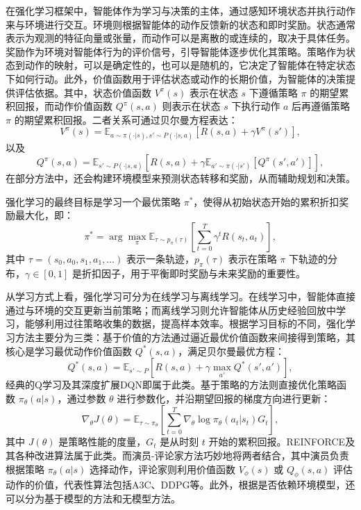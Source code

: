 在强化学习框架中，智能体作为学习与决策的主体，通过感知环境状态并执行动作来与环境进行交互。环境则根据智能体的动作反馈新的状态和即时奖励。状态通常表示为观测的特征向量或张量，而动作可以是离散的或连续的，取决于具体任务。奖励作为环境对智能体行为的评价信号，引导智能体逐步优化其策略。策略作为状态到动作的映射，可以是确定性的，也可以是随机的，它决定了智能体在特定状态下如何行动。此外，价值函数用于评估状态或动作的长期价值，为智能体的决策提供评估依据。其中，状态价值函数 $V^\pi(s)$ 表示在状态 $s$ 下遵循策略 $\pi$ 的期望累积回报，而动作价值函数 $Q^\pi(s, a)$ 则表示在状态 $s$ 下执行动作 $a$ 后再遵循策略 $\pi$ 的期望累积回报。二者关系可通过贝尔曼方程表达：
\begin{equation}
    V^\pi(s) = \mathbb{E}_{a \sim \pi(\cdot|s), s' \sim P(\cdot|s,a)} \left[ R(s, a) + \gamma V^\pi(s') \right],
\end{equation}
以及
\begin{equation}
    Q^\pi(s, a) = \mathbb{E}_{s' \sim P(\cdot|s,a)} \left[ R(s, a) + \gamma \mathbb{E}_{a' \sim \pi(\cdot|s')} \left[ Q^\pi(s', a') \right] \right],
\end{equation}
在部分方法中，还会构建环境模型来预测状态转移和奖励，从而辅助规划和决策。

强化学习的最终目标是学习一个最优策略 $\pi^*$，使得从初始状态开始的累积折扣奖励最大化，即：
\begin{equation}
    \pi^* = \arg\max_{\pi} \mathbb{E}_{\tau \sim p_\pi(\tau)} \left[ \sum_{t=0}^{T} \gamma^t R(s_t, a_t) \right],
\end{equation}
其中 $\tau = (s_0, a_0, s_1, a_1, \dots)$ 表示一条轨迹，$p_\pi(\tau)$ 表示在策略 $\pi$ 下轨迹的分布，$\gamma \in [0, 1]$ 是折扣因子，用于平衡即时奖励与未来奖励的重要性。

从学习方式上看，强化学习可分为在线学习与离线学习。在线学习中，智能体直接通过与环境的交互更新当前策略；而离线学习则允许智能体从历史经验回放中学习，能够利用过往策略收集的数据，提高样本效率。根据学习目标的不同，强化学习方法主要分为三类：基于价值的方法通过逼近最优价值函数来间接得到策略，其核心是学习最优动作价值函数 $Q^*(s, a)$，满足贝尔曼最优方程：
\begin{equation}
    Q^*(s, a) = \mathbb{E}_{s' \sim P} \left[ R(s, a) + \gamma \max_{a'} Q^*(s', a') \right],
\end{equation}
经典的Q学习及其深度扩展DQN即属于此类。基于策略的方法则直接优化策略函数 $\pi_\theta(a|s)$，通过参数 $\theta$ 进行参数化，并沿期望回报的梯度方向进行更新：
\begin{equation}
    \nabla_\theta J(\theta) = \mathbb{E}_{\tau \sim \pi_\theta} \left[ \sum_{t=0}^{T} \nabla_\theta \log \pi_\theta(a_t|s_t) G_t \right],
\end{equation}
其中 $J(\theta)$ 是策略性能的度量，$G_t$ 是从时刻 $t$ 开始的累积回报。REINFORCE及其各种改进算法属于此类。而演员-评论家方法巧妙地将两者结合，其中演员负责根据策略 $\pi_\theta(a|s)$ 选择动作，评论家则利用价值函数 $V_\phi(s)$ 或 $Q_\phi(s, a)$ 评估动作的价值，代表性算法包括A3C、DDPG等。此外，根据是否依赖环境模型，还可以分为基于模型的方法和无模型方法。

